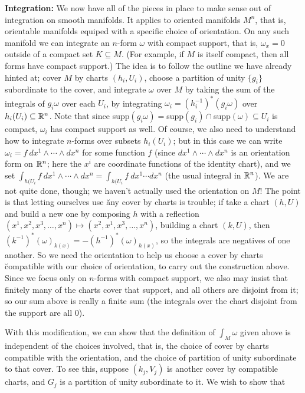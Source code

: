 \msk

{\bf Integration:} We now have all of the pieces in place to make sense out of integration on smooth manifolds.
It applies to oriented manifolds $M^n$, that is, orientable manifolds equiped with a specific choice of orientation.
On any such manifold we can integrate an $n$-form $\omega$ with compact support, that is, $\omega_x=0$ outside
of a compact set $K\subseteq M$. (For example, if $M$ is itself compact, then all forms have compact support.)
The idea is to follow the outline we have already hinted at; cover $M$ by charts $(h_i,U_i)$, choose a partition of unity
$\{g_i\}$ subordinate to the cover, and integrate $\omega$ over $M$ by taking the sum of the integrals of
$g_i\omega$ over each $U_i$, by integrating $\omega_i=(h_i^{-1})^*(g_i\omega)$ over $h_i(U_i)\subseteq {\Bbb R}^n$. Note that since
supp$(g_i\omega)=$supp$(g_i)\cap$supp$(\omega)\subseteq U_i$ is compact, $\omega_i$ has compact support as
well. Of course, we also need to understand how to integrate $n$-forms over subsets $h_i(U_i)$; but in this case
we can write $\omega_i=f\ dx^1\wedge\cdots\wedge dx^n$ for some function $f$ (since $dx^1\wedge\cdots\wedge dx^n$ is
an orientation form on ${\Bbb R}^n$; here the $x^i$ are coordinate functions of the identity chart), and we set 
$\int_{h(U_i}f\ dx^1\wedge\cdots\wedge dx^n=\int_{h(U_i}f\ dx^1\cdots dx^n$ (the usual integral in ${\Bbb R}^n$).
We are not quite done, though; we haven't actually used the orientation on $M$! The point is that letting ourselves
use \u{any} cover by charts is trouble; if take a chart $(h,U)$ and build a new one by composing $h$ with 
a reflection $(x^1,x^2,x^3,\ldots,x^n)\mapsto (x^2,x^1,x^3,\ldots,x^n)$, building a chart $(k,U)$, then 
$(k^{-1})^*(\omega)_{k(x)}=-(h^{-1})^*(\omega)_{h(x)}$, so the integrals are negatives of one another. So we need
the orientation to help us choose a cover by charts \u{compatible} with our choice of orientation, to carry out 
the construction above. Since we focus only on $n$-forms with compact support, we also may insist that finitely
many of the charts cover that support, and all others are disjoint from it; so our sum above is really 
a finite sum (the integrals over the chart disjoint from the support are all $0$).

With this modification, we can show that the definition of $\int_M\omega$ given above is independent of the
choices involved, that is, the choice of cover by charts compatible with the orientation, and the
choice of partition of unity subordinate to that cover. To see this, suppose $(k_j,V_j)$ is another 
cover by compatible charts, and $G_j$ is a partition of unity subordinate to it. We wish to show that

